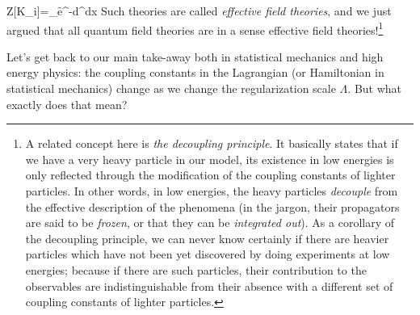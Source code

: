 \documentclass[12pt]{article}
\numberwithin{equation}{section}
\begin{document}
\be 
Z[K_i]=\int_\Lambda \cD \f e^{-\int d^dx}
\ee 
Such theories are called \emph{effective field theories}, and we just argued that all quantum field theories are in a sense effective field theories!\footnote{\label{footnote: decoupling principle}
A related concept here is \emph{the decoupling principle}. It basically states that if we have a very heavy particle in our model, its existence in low energies is only reflected through the modification of the coupling constants of lighter particles. In other words, in low energies, the heavy particles \emph{decouple} from the effective description of the phenomena (in the jargon, their propagators are said to be \emph{frozen}, or that they can be\emph{ integrated out}). As a corollary of the decoupling principle, we can never know certainly if there are heavier particles which have not been yet discovered by doing experiments at low energies; because if there are such particles, their contribution to the observables are indistinguishable from their absence with a different set of coupling constants of lighter particles.
}

Let's get back to our main take-away both in statistical mechanics and high energy physics: the coupling constants in the Lagrangian (or Hamiltonian in statistical mechanics) change as we change the regularization scale $\Lambda$. But what exactly does that mean?
\end{document}
